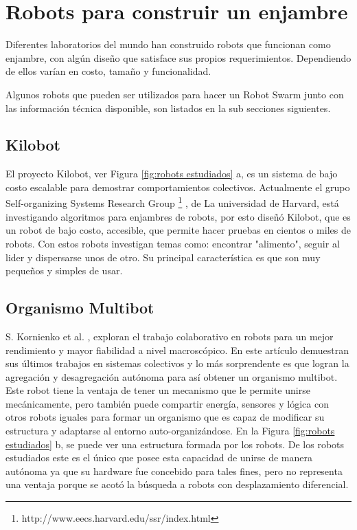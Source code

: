 \section{Robots para construir un enjambre}

Diferentes laboratorios del mundo han construido robots que funcionan como enjambre, con algún diseño que satisface sus propios requerimientos. Dependiendo de ellos varían en costo, tamaño y funcionalidad.

Algunos robots que pueden ser utilizados para hacer un Robot Swarm junto con las información técnica disponible, son listados en la sub secciones siguientes.

\subsection{Kilobot}
El proyecto Kilobot, ver Figura \ref{fig:robots estudiados} a, es un sistema de bajo costo escalable para demostrar comportamientos colectivos. Actualmente el grupo Self-organizing Systems Research Group \footnote{http://www.eecs.harvard.edu/ssr/index.html} , de La universidad de Harvard, está investigando algoritmos para enjambres de robots, por esto diseñó Kilobot, que es un robot de bajo costo, accesible,  que permite hacer pruebas en cientos o miles de robots. Con estos robots investigan temas como: encontrar "alimento", seguir al lider y dispersarse unos de otro. Su principal característica es que son muy pequeños y simples de usar.

\subsection{Organismo Multibot}
S. Kornienko et al. \cite{5359578}, exploran el trabajo colaborativo en robots para un mejor rendimiento y mayor fiabilidad a nivel macroscópico. En este artículo demuestran sus últimos trabajos en sistemas colectivos y lo más sorprendente es que logran la agregación y desagregación autónoma para así obtener un organismo multibot. Este robot tiene la ventaja de tener un mecanismo que le permite unirse mecánicamente, pero también puede compartir energía, sensores y lógica con otros robots iguales para formar un organismo que es capaz de modificar su estructura y adaptarse al entorno auto-organizándose. En la Figura \ref{fig:robots estudiados} b, se puede ver una estructura formada por los robots. De los robots estudiados este es el único que posee esta capacidad de unirse de manera autónoma ya que su hardware fue concebido para tales fines, pero no representa una ventaja porque se acotó la búsqueda a robots con desplazamiento diferencial.

